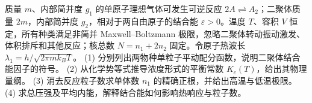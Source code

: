 质量 \(m\)、内部简并度 \(g_1\) 的单原子理想气体可发生可逆反应 \(2A\rightleftharpoons A_2\)；二聚体质量 \(2m\)，内部简并度 \(g_2\)，相对于两自由原子的结合能 \(\varepsilon>0\)。温度 \(T\)、容积 \(V\) 恒定，所有种类满足非简并 Maxwell--Boltzmann 极限，忽略二聚体转动振动激发、体积排斥和其他反应；核总数 \(N=n_1+2n_2\) 固定。令原子热波长 \(\lambda_1=h/\sqrt{2\pi mk_BT}\)。
(1) 分别列出两物种单粒子平动配分函数，说明二聚体结合能因子的符号。
(2) 从化学势等式推导浓度形式的平衡常数 \(K_c(T)\)，给出其物理量纲。
(3) 消去反应粒子数求单体数 \(n_1\) 的精确正根，并给出高温与低温极限。
(4) 求总压强及平均内能，解释结合能如何影响热响应与粒子数。
